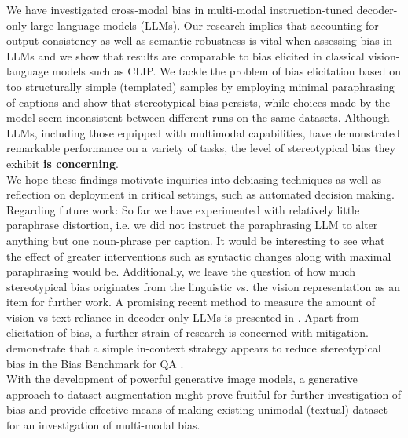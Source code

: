 \documentclass[11pt]{article}
\begin{document}
We have investigated cross-modal bias in multi-modal instruction-tuned decoder-only large-language models (LLMs). Our research implies that accounting for output-consistency as well as semantic robustness is vital when assessing bias in LLMs and we show that results are comparable to bias elicited in classical vision-language models such as CLIP. We tackle the problem of bias elicitation based on too structurally simple (templated) samples by employing minimal paraphrasing of captions and show that stereotypical bias persists, while choices made by the model seem inconsistent between different runs on the same datasets. Although LLMs, including those equipped with multimodal capabilities, have demonstrated remarkable performance on a variety of tasks, the level of stereotypical bias they exhibit \textbf{is concerning}.\\ 
We hope these findings motivate inquiries into debiasing techniques as well as reflection on deployment in critical settings, such as automated decision making.
\\
Regarding future work: So far we have experimented with relatively little paraphrase distortion, i.e. we did not instruct the paraphrasing LLM to alter anything but one noun-phrase per caption. It would be interesting to see what the effect of greater interventions such as syntactic changes along with maximal paraphrasing would be. 
Additionally, we leave the question of how much stereotypical bias originates from the linguistic vs. the vision representation as an item for further work. A promising recent method to measure the amount of vision-vs-text reliance in decoder-only LLMs is presented in \citet{parcalabescu_vision_2024}.
Apart from elicitation of bias, a further strain of research is concerned with mitigation. \citet{gallegos_self-debiasing_2024} demonstrate that a simple in-context strategy appears to reduce stereotypical bias in the Bias Benchmark for QA \citep{parrish_bbq_2022}. \\
With the development of powerful generative image models, a generative approach to dataset augmentation might prove fruitful for further investigation of bias and provide effective means of making existing unimodal (textual) dataset for an investigation of multi-modal bias.
\end{document}
